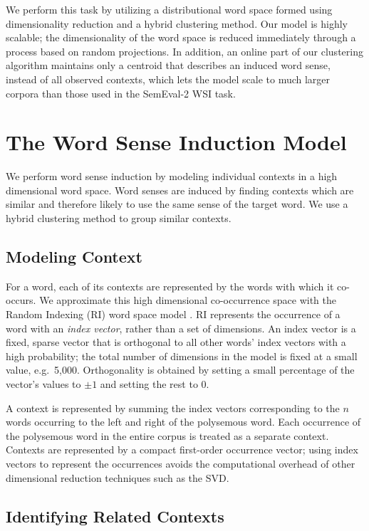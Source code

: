 \documentclass[11pt,a4]{article}
\begin{document}
We perform this task by utilizing a distributional word space formed using
dimensionality reduction and a hybrid clustering method.  Our model is highly
scalable; the dimensionality of the word space is reduced immediately through a
process based on random projections.  In addition, an online part of our
clustering algorithm maintains only a centroid that describes an induced word
sense, instead of all observed contexts, which lets the model scale to much
larger corpora than those used in the SemEval-2 WSI task.

\section{The Word Sense Induction Model}
\label{sec:alg}

We perform word sense induction by modeling individual contexts in a high
dimensional word space.  
Word senses are induced by finding contexts which are similar and therefore
likely to use the same sense of the target word.  We use a hybrid clustering
method to group similar contexts. 

\subsection{Modeling Context}
\label{sec:context}

For a word, each of its contexts are represented by the words with which it
co-occurs.  We approximate this high dimensional co-occurrence space with the
Random Indexing (RI) word space model \cite{kanerva00random}.  RI represents the
occurrence of a word with an \emph{index vector}, rather than a set of
dimensions.  An index vector is a fixed, sparse vector that is orthogonal to all
other words' index vectors with a high probability; the total number of
dimensions in the model is fixed at a small value, e.g.\ 5,000.  Orthogonality
is obtained by setting a small percentage of the vector's values to $\pm1$ and
setting the rest to $0$.

A context is represented by summing the index vectors corresponding to the $n$
words occurring to the left and right of the polysemous word.  
Each occurrence of the polysemous word in the entire corpus is treated as a
separate context.
Contexts are represented by a compact first-order occurrence vector; using index
vectors to represent the occurrences avoids the computational overhead of other
dimensional reduction techniques such as the SVD.

\subsection{Identifying Related Contexts}
\label{sec:clustering}
\end{document}
